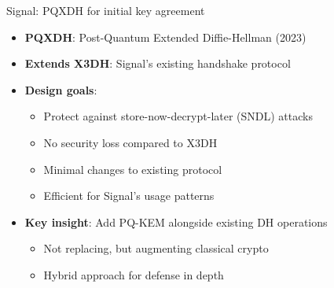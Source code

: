 \ifdefined\PRESENTATION\else\PassOptionsToClass{handout}{beamer}\fi\documentclass[aspectratio=169, lualatex]{beamer}
\begin{document}
\begin{frame}{Signal: PQXDH for initial key agreement}
	\begin{itemize}
		\item \textbf{PQXDH}: Post-Quantum Extended Diffie-Hellman (2023)
		\item \textbf{Extends X3DH}: Signal's existing handshake protocol
		\item \textbf{Design goals}:
		      \begin{itemize}
			      \item Protect against store-now-decrypt-later (SNDL) attacks
			      \item No security loss compared to X3DH
			      \item Minimal changes to existing protocol
			      \item Efficient for Signal's usage patterns
		      \end{itemize}
		\item \textbf{Key insight}: Add PQ-KEM alongside existing DH operations
		      \begin{itemize}
			      \item Not replacing, but augmenting classical crypto
			      \item Hybrid approach for defense in depth
		      \end{itemize}
	\end{itemize}
\end{frame}
\end{document}

